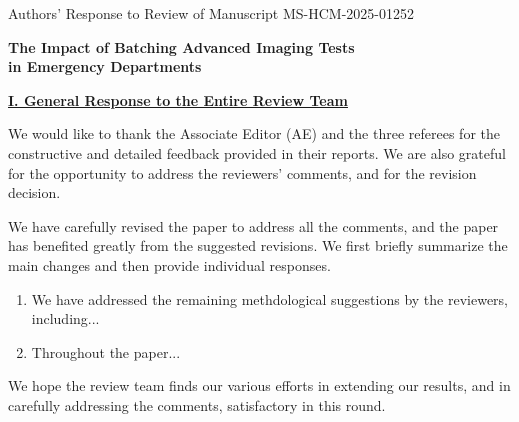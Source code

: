 \documentclass[11pt]{article}
\newcommand{\1}{\hbox{\rm 1\kern-.35em 1}}
\begin{document}
\setlength{\parindent}{0pt}
\pagestyle{fancy}
\fancyhead{}
\renewcommand{\headrulewidth}{0.0pt}

\begin{center}
{Authors' Response to Review of Manuscript MS-HCM-2025-01252}

\vspace{1mm}
\Large
\textbf{The Impact of Batching Advanced Imaging Tests\\ in Emergency Departments}
\vspace{1mm}

\end{center}
 \normalsize
\baselineskip=16pt
\noindent\underline{\textbf{I. General Response to the Entire Review Team}}

\noindent We would like to thank the Associate Editor (AE) and the three referees for the constructive and detailed feedback provided in their reports. We are also grateful for the opportunity to address the reviewers' comments, and for the revision decision.

We have carefully revised the paper to address all the comments, and the paper has benefited greatly from the suggested revisions. We first briefly summarize the main changes and then provide individual responses.

\begin{enumerate}
\item We have addressed the remaining methdological suggestions by the reviewers, including...
\item Throughout the paper...
\end{enumerate}


We hope the review team finds our various efforts in extending our results, and in carefully addressing the comments, satisfactory in this round.









\clearpage
\end{document}
